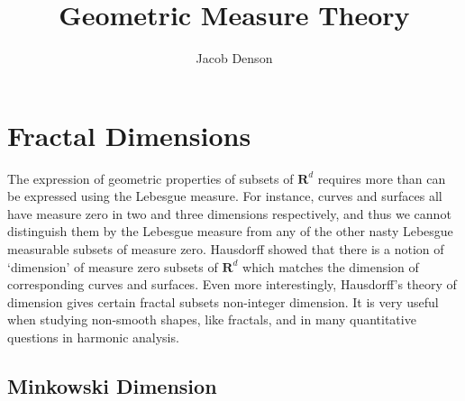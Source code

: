 

\title{Geometric Measure Theory}
\author{Jacob Denson}




\maketitle

\tableofcontents


\chapter{Fractal Dimensions}

The expression of geometric properties of subsets of $\mathbf{R}^d$ requires more than can be expressed using the Lebesgue measure. For instance, curves and surfaces all have measure zero in two and three dimensions respectively, and thus we cannot distinguish them by the Lebesgue measure from any of the other nasty Lebesgue measurable subsets of measure zero. Hausdorff showed that there is a notion of `dimension' of measure zero subsets of $\mathbf{R}^d$ which matches the dimension of corresponding curves and surfaces. Even more interestingly, Hausdorff's theory of dimension gives certain fractal subsets non-integer dimension. It is very useful when studying non-smooth shapes, like fractals, and in many quantitative questions in harmonic analysis.


\section{Minkowski Dimension}

